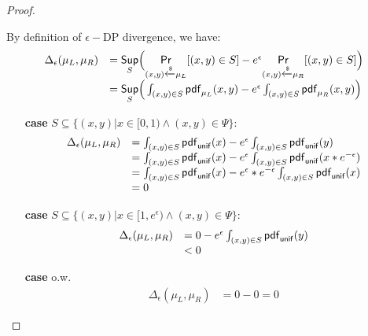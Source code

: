 \documentclass{article}
\begin{document}
\begin{proof}
\begin{itemize}
	By definition of $\epsilon-$DP divergence, we have:
	 \[
	 \begin{array}{ll}
	 \Delta_{\epsilon}(\mu_L, \mu_R) 
	 & = \underset{S}{\mathsf{Sup}}
	 \Big(
	 \underset{(x,y) \xleftarrow{\$} \mu_L}{\mathsf{Pr}}[(x,y) \in S] - e^{\epsilon} \underset{(x,y) \xleftarrow{\$} \mu_R}{\mathsf{Pr}}[(x,y) \in S]
	 \Big) \\
	 & =\underset{S}{\mathsf{Sup}}
	 \Big(
	 \int_{(x,y) \in S} \mathsf{pdf}_{\mu_L}(x, y) - e^{\epsilon} \int_{(x,y) \in S} \mathsf{pdf}_{\mu_R}(x, y)
	 \Big)	 
	 \end{array}
	 \]
	 \begin{itemize}
	 	\item[{\bf case}] $S \subseteq \{(x, y) | x \in [0, 1) \land (x, y) \in \Psi\}$:\\
		 \[
		 \begin{array}{ll}
		 \Delta_{\epsilon}(\mu_L, \mu_R) 
		 & = 
		 \int_{(x,y) \in S} \mathsf{pdf}_{\mathsf{unif}}(x) - e^{\epsilon} \int_{(x,y) \in S} \mathsf{pdf}_{\mathsf{unif}}(y)\\
		 & = 
		 \int_{(x,y) \in S} \mathsf{pdf}_{\mathsf{unif}}(x) - e^{\epsilon} \int_{(x,y) \in S} \mathsf{pdf}_{\mathsf{unif}}(x * e^{-\epsilon})\\ 
		 & = 
		 \int_{(x,y) \in S} \mathsf{pdf}_{\mathsf{unif}}(x) - e^{\epsilon}* e^{-\epsilon} \int_{(x,y) \in S} \mathsf{pdf}_{\mathsf{unif}}(x )\\
		 & = 0 
		 \end{array}
		 \]
	 	\item[{\bf case}] $S \subseteq \{(x, y) | x \in [1, e^{\epsilon}) \land (x, y) \in \Psi\}$:\\
		 \[
		 \begin{array}{ll}
		 \Delta_{\epsilon}(\mu_L, \mu_R) 
		 & = 
		 0 - e^{\epsilon} \int_{(x,y) \in S} \mathsf{pdf}_{\mathsf{unif}}(y)\\
		 & <  0 
		 \end{array}
		 \]
	 	\item[{\bf case}] o.w.\\
		 \[
		 \begin{array}{ll}
		 \Delta_{\epsilon}(\mu_L, \mu_R) 
		 & = 0 - 0 =  0 
		 \end{array}
		 \]	 	

	 \end{itemize}

\end{itemize}
\end{proof}
\newpage


\end{document}
